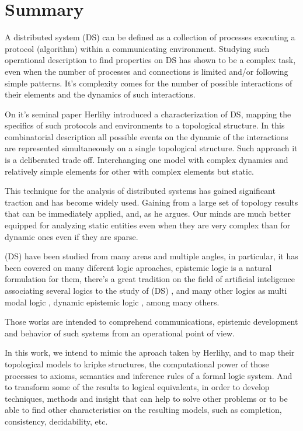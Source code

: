 \documentclass{tufte-book} %
\begin{document}
\chapter{Summary} 

A distributed system (DS) can be defined as a collection of processes executing 
a protocol (algorithm) within a communicating environment. 
Studying such operational description to find properties on DS has shown to be 
a complex task, even when the number of processes and connections is limited 
and/or following simple patterns. It's complexity comes for the number of possible 
interactions of their elements  and the dynamics of such interactions.

On it's seminal paper \cite{Herlihy1999} Herlihy  introduced a characterization of DS, 
mapping the specifics of such protocols and environments to a topological structure.
In this combinatorial description all possible events on the dynamic of the interactions 
are represented simultaneously on a single topological structure.
Such approach it is a deliberated trade off. Interchanging one model with complex 
dynamics and relatively simple elements for other with complex elements but static.

This technique for the analysis of distributed systems has gained significant traction 
and has become widely used.
Gaining from a large set of topology results that can be immediately applied, and, as 
he argues. Our minds are much better equipped for analyzing static entities even when they are very complex than for dynamic ones even if they are sparse.

(DS) have been studied from many areas and multiple angles, in particular, it has been 
covered on many diferent logic aproaches, epistemic logic \cite{Meyer:1995} is a natural formulation for 
them, there's a great tradition on the field of artificial inteligence associating several logics to the study of (DS) \cite{HandbookAI1}, and many other logics as multi modal logic \cite{Hintikka1962}, dynamic epistemic logic \cite{Ditmarsch:2007}, among many others.
\newpage

Those works are intended to comprehend communications, epistemic development and 
behavior of such systems from an operational point of view.

In this work, we intend to mimic the aproach taken by Herlihy, and to map their topological models to kripke structures, the computational power of those processes to axioms, semantics and inference  rules of a formal logic system. And to transform some of the results to logical equivalents, in order to develop techniques, methods and insight that can help to solve other problems or to be able to find other characteristics on the resulting models, such as completion, consistency, decidability, etc.
\end{document}
